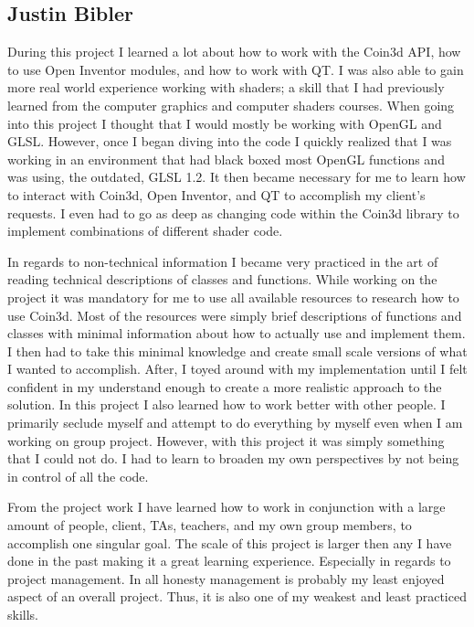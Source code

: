 \documentclass[10pt,journal,compsoc,draftclsnofoot]{IEEEtran}
\begin{document}
\begin{flushleft}
\subsection{Justin Bibler}
During this project I learned a lot about how to work with the Coin3d API, how to use Open Inventor modules, and how to work with QT.
I was also able to gain more real world experience working with shaders; a skill that I had previously learned from the computer graphics and computer shaders courses.
When going into this project I thought that I would mostly be working with OpenGL and GLSL.
However, once I began diving into the code I quickly realized that I was working in an environment that had black boxed most OpenGL functions and was using, the outdated, GLSL 1.2.
It then became necessary for me to learn how to interact with Coin3d, Open Inventor, and QT to accomplish my client's requests.
I even had to go as deep as changing code within the Coin3d library to implement combinations of different shader code.\par
\vspace{3mm}
In regards to non-technical information I became very practiced in the art of reading technical descriptions of classes and functions.
While working on the project it was mandatory for me to use all available resources to research how to use Coin3d.
Most of the resources were simply brief descriptions of functions and classes with minimal information about how to actually use and implement them.
I then had to take this minimal knowledge and create small scale versions of what I wanted to accomplish.
After, I toyed around with my implementation until I felt confident in my understand enough to create a more realistic approach to the solution.
In this project I also learned how to work better with other people.
I primarily seclude myself and attempt to do everything by myself even when I am working on group project.
However, with this project it was simply something that I could not do.
I had to learn to broaden my own perspectives by not being in control of all the code. \par
\vspave{3mm}
From the project work I have learned how to work in conjunction with a large amount of people, client, TAs, teachers, and my own group members, to accomplish one singular goal.
The scale of this project is larger then any I have done in the past making it a great learning experience.
Especially in regards to project management.
In all honesty management is probably my least enjoyed aspect of an overall project.
Thus, it is also one of my weakest and least practiced skills.

\end{flushleft}
\end{document}
